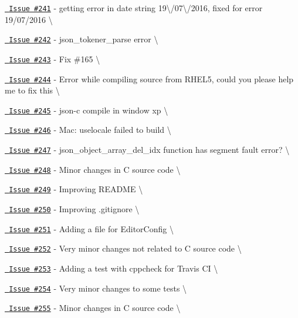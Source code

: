 \begin{DoxyItemize}
\item \href{https://github.com/json-c/json-c/issues/241}{\texttt{ Issue \#241}} -\/ getting error in date string 19\textbackslash{}/07\textbackslash{}/2016, fixed for error 19/07/2016 \textbackslash{}
\item \href{https://github.com/json-c/json-c/issues/242}{\texttt{ Issue \#242}} -\/ json\+\_\+tokener\+\_\+parse error \textbackslash{}
\item \href{https://github.com/json-c/json-c/issues/243}{\texttt{ Issue \#243}} -\/ Fix \#165 \textbackslash{}
\item \href{https://github.com/json-c/json-c/issues/244}{\texttt{ Issue \#244}} -\/ Error while compiling source from RHEL5, could you please help me to fix this \textbackslash{}
\item \href{https://github.com/json-c/json-c/issues/245}{\texttt{ Issue \#245}} -\/ json-\/c compile in window xp \textbackslash{}
\item \href{https://github.com/json-c/json-c/issues/246}{\texttt{ Issue \#246}} -\/ Mac\+: uselocale failed to build \textbackslash{}
\item \href{https://github.com/json-c/json-c/issues/247}{\texttt{ Issue \#247}} -\/ json\+\_\+object\+\_\+array\+\_\+del\+\_\+idx function has segment fault error? \textbackslash{}
\item \href{https://github.com/json-c/json-c/issues/248}{\texttt{ Issue \#248}} -\/ Minor changes in C source code \textbackslash{}
\item \href{https://github.com/json-c/json-c/issues/249}{\texttt{ Issue \#249}} -\/ Improving README \textbackslash{}
\item \href{https://github.com/json-c/json-c/issues/250}{\texttt{ Issue \#250}} -\/ Improving .gitignore \textbackslash{}
\item \href{https://github.com/json-c/json-c/issues/251}{\texttt{ Issue \#251}} -\/ Adding a file for Editor\+Config \textbackslash{}
\item \href{https://github.com/json-c/json-c/issues/252}{\texttt{ Issue \#252}} -\/ Very minor changes not related to C source code \textbackslash{}
\item \href{https://github.com/json-c/json-c/issues/253}{\texttt{ Issue \#253}} -\/ Adding a test with cppcheck for Travis CI \textbackslash{}
\item \href{https://github.com/json-c/json-c/issues/254}{\texttt{ Issue \#254}} -\/ Very minor changes to some tests \textbackslash{}
\item \href{https://github.com/json-c/json-c/issues/255}{\texttt{ Issue \#255}} -\/ Minor changes in C source code \textbackslash{}

\end{DoxyItemize}
